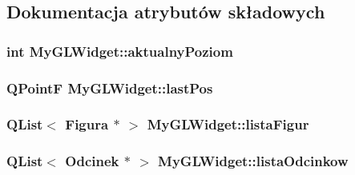 \subsection{Dokumentacja atrybutów składowych}
\hypertarget{classMyGLWidget_ab3fcfaa0bcedb9ee1b56fdacf58499ba}{
\subsubsection[{aktualny\-Poziom}]{\setlength{\rightskip}{0pt plus 5cm}int My\-G\-L\-Widget\-::aktualny\-Poziom\hspace{0.3cm}{\ttfamily [protected]}}}\label{classMyGLWidget_ab3fcfaa0bcedb9ee1b56fdacf58499ba}
\hypertarget{classMyGLWidget_afc6be3de6cfab3079b8d36ab85d13317}{
\subsubsection[{last\-Pos}]{\setlength{\rightskip}{0pt plus 5cm}Q\-Point\-F My\-G\-L\-Widget\-::last\-Pos\hspace{0.3cm}{\ttfamily [protected]}}}\label{classMyGLWidget_afc6be3de6cfab3079b8d36ab85d13317}
\hypertarget{classMyGLWidget_abaf64d08c7bac0df986839ac063b02c2}{
\subsubsection[{lista\-Figur}]{\setlength{\rightskip}{0pt plus 5cm}Q\-List$<$ {\bf Figura} $\ast$ $>$ My\-G\-L\-Widget\-::lista\-Figur\hspace{0.3cm}{\ttfamily [protected]}}}\label{classMyGLWidget_abaf64d08c7bac0df986839ac063b02c2}
\hypertarget{classMyGLWidget_a8bffb841dfb582085520d96a83ae09b9}{
\subsubsection[{lista\-Odcinkow}]{\setlength{\rightskip}{0pt plus 5cm}Q\-List$<$ {\bf Odcinek} $\ast$ $>$ My\-G\-L\-Widget\-::lista\-Odcinkow\hspace{0.3cm}{\ttfamily [protected]}}}\label{classMyGLWidget_a8bffb841dfb582085520d96a83ae09b9}
